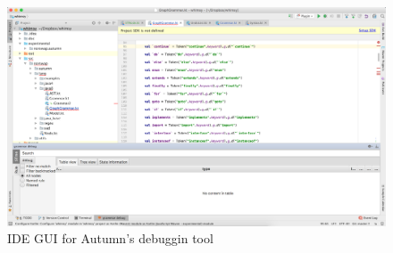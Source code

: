 	\begin{figure}[h]
		\includegraphics[width=1\textwidth] {ressources/intj_plug}
		\caption{IDE GUI for Autumn's debuggin tool} 
		\label{fig:intj_plug}
	\end{figure}





